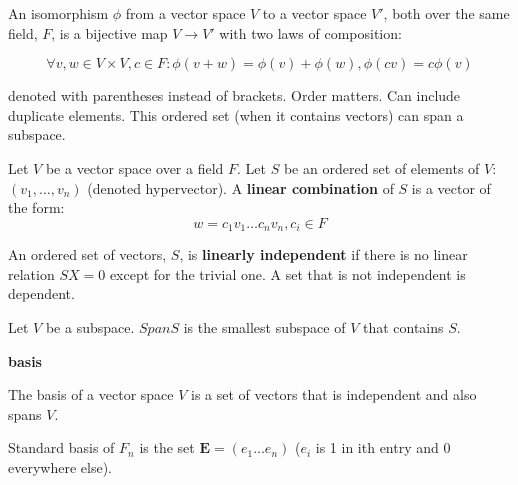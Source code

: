 \begin{definition}
  An isomorphism $\phi$ from a vector space $V$ to a vector space $V'$, both over
  the same field, $F$, is a bijective map $V \rightarrow V'$ with two laws of composition:

  \[\forall v,w \in V \times V, c \in F: \phi ( v + w ) = \phi (v) + \phi (w), \phi (cv) = c \phi (v)\]

\end{definition}

\begin{definition}
  denoted with parentheses instead of brackets. Order matters. Can include
  duplicate elements. This ordered set (when it contains vectors) can span a
  subspace.
\end{definition}

\begin{definition}

  Let $V$ be a vector space over a field $F$. Let $S$ be an ordered set of
elements of $V$: $(v_{1},\ldots, v_{n})$ (denoted hypervector). A \textbf{linear
combination} of $S$ is a vector of the form:
  \[w = c_{1}v_{1}\ldots c_{n}v_{n}, c_{i} \in F\]

\end{definition}

\begin{definition}

  An ordered set of vectors, $S$, is \textbf{linearly independent} if there is
no linear relation $SX = 0$ except for the trivial one. A set that is not
independent is dependent.

\end{definition}

\begin{definition}

  Let $V$ be a subspace. $Span S$ is the smallest subspace of $V$ that contains
  $S$.

\end{definition}

\begin{definition}{\bfseries basis}

  The basis of a vector space $V$ is a set of vectors that is independent and
  also spans $V$.

  Standard basis of $F_{n}$ is the set $\textbf{E}=(e_{1}\ldots e_{n})$ ($e_{i}$
is 1 in ith entry and 0 everywhere else).

\end{definition}

